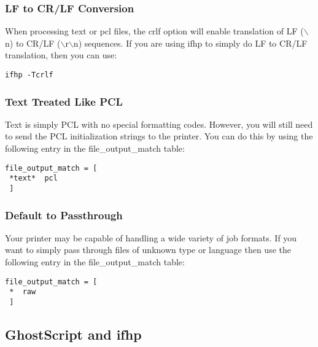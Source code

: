 \documentclass[a4paper]{article}
\begin{document}
\subsubsection{LF to CR/LF Conversion
\label{crlf}}

When processing {\ttfamily text} or {\ttfamily pcl} files,
the {\ttfamily crlf} option will enable translation of
LF ({\ttfamily $\backslash$n}) to CR/LF ({\ttfamily $\backslash$r$\backslash$n}) sequences.
If you are using {\ttfamily ifhp} to simply do LF to CR/LF translation,
then you can use:
\begin{tscreen}
\begin{verbatim}
ifhp -Tcrlf
\end{verbatim}
\end{tscreen}



\subsubsection{Text Treated Like PCL}

Text is simply PCL with no special formatting codes.
However, you will still need to send the PCL initialization
strings to the printer.
You can do this by using the following entry in the
{\ttfamily file\_output\_match} table:
\begin{tscreen}
\begin{verbatim}
file_output_match = [
 *text*  pcl
 ]
\end{verbatim}
\end{tscreen}



\subsubsection{Default to Passthrough}

Your printer may be capable of handling a wide variety of job
formats.  If you want to simply pass through files of
unknown type or language then use the following entry in the
{\ttfamily file\_output\_match} table:
\begin{tscreen}
\begin{verbatim}
file_output_match = [
 *  raw
 ]
\end{verbatim}
\end{tscreen}



\subsection{GhostScript and ifhp
\label{ghostscriptconfig}}
\end{document}
